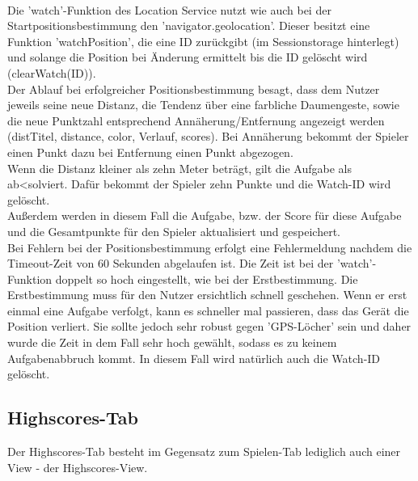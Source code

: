 \\
Die 'watch'-Funktion des Location Service nutzt wie auch bei der Startpositionsbestimmung den 'navigator.geolocation'. Dieser besitzt eine Funktion 'watchPosition', die eine ID zurückgibt (im Sessionstorage hinterlegt) und solange die Position bei Änderung ermittelt bis die ID gelöscht wird (clearWatch(ID)).
\\
Der Ablauf bei erfolgreicher Positionsbestimmung besagt, dass dem Nutzer jeweils seine neue Distanz, die Tendenz über eine farbliche Daumengeste, sowie die neue Punktzahl entsprechend Annäherung/Entfernung angezeigt werden (distTitel, distance, color, Verlauf, scores). Bei Annäherung bekommt der Spieler einen Punkt dazu bei Entfernung einen Punkt abgezogen.
\\
Wenn die Distanz kleiner als zehn Meter beträgt, gilt die Aufgabe als ab<solviert. Dafür bekommt der Spieler zehn Punkte und die Watch-ID wird gelöscht.
\\
Außerdem werden in diesem Fall die Aufgabe, bzw. der Score für diese Aufgabe und die Gesamtpunkte für den Spieler aktualisiert und gespeichert.
\\
Bei Fehlern bei der Positionsbestimmung erfolgt eine Fehlermeldung nachdem die Timeout-Zeit von 60 Sekunden abgelaufen ist. Die Zeit ist bei der 'watch'-Funktion doppelt so hoch eingestellt, wie bei der Erstbestimmung. Die Erstbestimmung muss für den Nutzer ersichtlich schnell geschehen. Wenn er erst einmal eine Aufgabe verfolgt, kann es schneller mal passieren, dass das Gerät die Position verliert. Sie sollte jedoch sehr robust gegen 'GPS-Löcher' sein und daher wurde die Zeit in dem Fall sehr hoch gewählt, sodass es zu keinem Aufgabenabbruch kommt. In diesem Fall wird natürlich auch die Watch-ID gelöscht.
\subsection{Highscores-Tab}
Der Highscores-Tab besteht im Gegensatz zum Spielen-Tab lediglich auch einer View - der Highscores-View.
